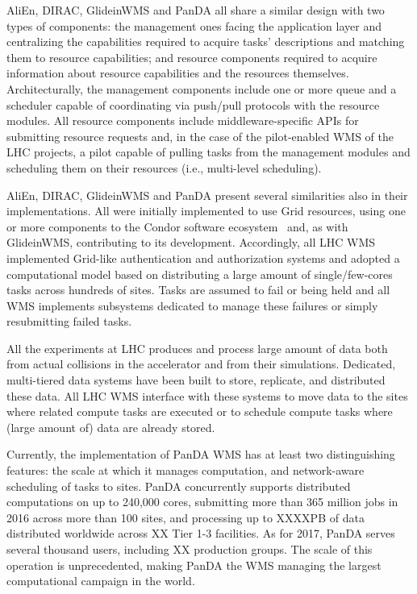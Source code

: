 AliEn, DIRAC, GlideinWMS and PanDA all share a similar design with two types of
components: the management ones facing the application layer and centralizing
the capabilities required to acquire tasks' descriptions and matching them to
resource capabilities; and resource components required to acquire information
about resource capabilities and the resources themselves. Architecturally, the
management components include one or more queue and a scheduler capable of
coordinating via push/pull protocols with the resource modules. All resource
components include middleware-specific APIs for submitting resource requests
and, in the case of the pilot-enabled WMS of the LHC projects, a pilot capable
of pulling tasks from the management modules and scheduling them on their
resources (i.e., multi-level scheduling).

AliEn, DIRAC, GlideinWMS and PanDA present several similarities also in their
implementations. All were initially implemented to use Grid resources, using one
or more components to the Condor software ecosystem~\cite{thain2005distributed}
and, as with GlideinWMS, contributing to its development. Accordingly, all LHC
WMS implemented Grid-like authentication and authorization systems and adopted a
computational model based on distributing a large amount of single/few-cores
tasks across hundreds of sites. Tasks are assumed to fail
or being held and all WMS implements subsystems dedicated to manage these
failures or simply resubmitting failed tasks.

All the experiments at LHC produces and process large amount of data both from
actual collisions in the accelerator and from their simulations. Dedicated,
multi-tiered data systems have been built to store, replicate, and distributed
these data. All LHC WMS interface with these systems to move data to the sites
where related compute tasks are executed or to schedule compute tasks where
(large amount of) data are already stored.

Currently, the implementation of PanDA WMS has at least two distinguishing
features: the scale at which it manages computation, and network-aware
scheduling of tasks to sites. PanDA concurrently supports distributed
computations on up to 240,000 cores, submitting more than 365 million jobs in
2016 across more than 100 sites, and processing up to XXXXPB of data distributed
worldwide across XX Tier 1-3 facilities. As for 2017, PanDA serves several
thousand users, including XX production groups. The scale of this operation is
unprecedented, making PanDA the WMS managing the largest computational campaign
in the world.

